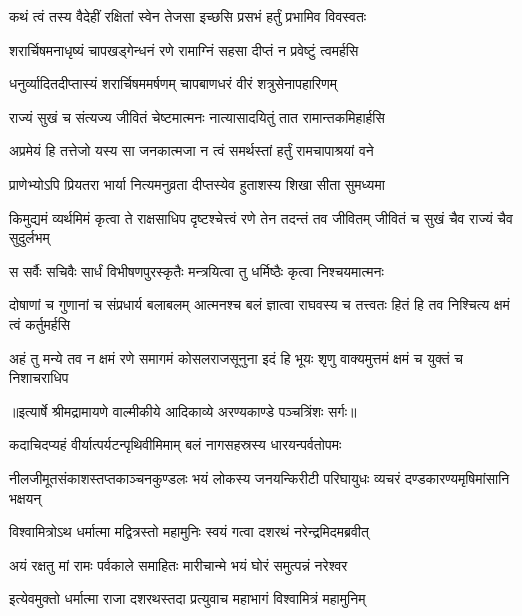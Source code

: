 \twolineshloka
{कथं त्वं तस्य वैदेहीं रक्षितां स्वेन तेजसा}
{इच्छसि प्रसभं हर्तुं प्रभामिव विवस्वतः} %

\twolineshloka
{शरार्चिषमनाधृष्यं चापखड्गेन्धनं रणे}
{रामाग्निं सहसा दीप्तं न प्रवेष्टुं त्वमर्हसि} %

\twolineshloka
{धनुर्व्यादितदीप्तास्यं शरार्चिषममर्षणम्}
{चापबाणधरं वीरं शत्रुसेनापहारिणम्} %

\twolineshloka
{राज्यं सुखं च संत्यज्य जीवितं चेष्टमात्मनः}
{नात्यासादयितुं तात रामान्तकमिहार्हसि} %

\twolineshloka
{अप्रमेयं हि तत्तेजो यस्य सा जनकात्मजा}
{न त्वं समर्थस्तां हर्तुं रामचापाश्रयां वने} %

\twolineshloka
{प्राणेभ्योऽपि प्रियतरा भार्या नित्यमनुव्रता}
{दीप्तस्येव हुताशस्य शिखा सीता सुमध्यमा} %

\threelineshloka
{किमुद्यमं व्यर्थमिमं कृत्वा ते राक्षसाधिप}
{दृष्टश्चेत्त्वं रणे तेन तदन्तं तव जीवितम्}
{जीवितं च सुखं चैव राज्यं चैव सुदुर्लभम्} %

\twolineshloka
{स सर्वैः सचिवैः सार्धं विभीषणपुरस्कृतैः}
{मन्त्रयित्वा तु धर्मिष्ठैः कृत्वा निश्चयमात्मनः} %

\threelineshloka
{दोषाणां च गुणानां च संप्रधार्य बलाबलम्}
{आत्मनश्च बलं ज्ञात्वा राघवस्य च तत्त्वतः}
{हितं हि तव निश्चित्य क्षमं त्वं कर्तुमर्हसि} %

\fourlineindentedshloka
{अहं तु मन्ये तव न क्षमं रणे}
{ समागमं कोसलराजसूनुना}
{इदं हि भूयः शृणु वाक्यमुत्तमं}
{ क्षमं च युक्तं च निशाचराधिप} %


{॥इत्यार्षे श्रीमद्रामायणे वाल्मीकीये आदिकाव्ये अरण्यकाण्डे पञ्चत्रिंशः सर्गः॥}


\twolineshloka
{कदाचिदप्यहं वीर्यात्पर्यटन्पृथिवीमिमाम्}
{बलं नागसहस्रस्य धारयन्पर्वतोपमः} %

\threelineshloka
{नीलजीमूतसंकाशस्तप्तकाञ्चनकुण्डलः}
{भयं लोकस्य जनयन्किरीटी परिघायुधः}
{व्यचरं दण्डकारण्यमृषिमांसानि भक्षयन्} %

\twolineshloka
{विश्वामित्रोऽथ धर्मात्मा मद्वित्रस्तो महामुनिः}
{स्वयं गत्वा दशरथं नरेन्द्रमिदमब्रवीत्} %

\twolineshloka
{अयं रक्षतु मां रामः पर्वकाले समाहितः}
{मारीचान्मे भयं घोरं समुत्पन्नं नरेश्वर} %

\twolineshloka
{इत्येवमुक्तो धर्मात्मा राजा दशरथस्तदा}
{प्रत्युवाच महाभागं विश्वामित्रं महामुनिम्} %


